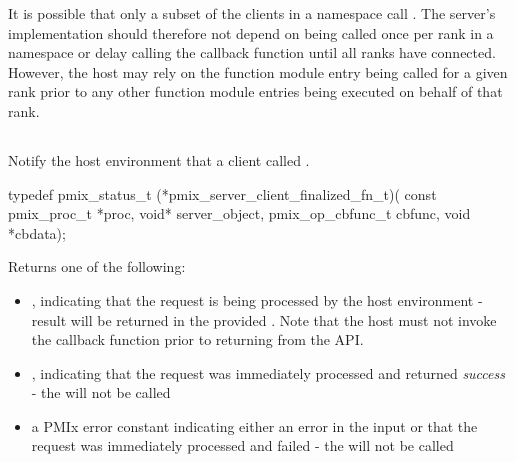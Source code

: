 It is possible that only a subset of the clients in a namespace call
.   The server's 
implementation should therefore not depend on being called once per rank in a
namespace or delay calling the callback function until all ranks have
connected. However, the host may rely on the
function module entry being called for a given rank prior to any other function
module entries being executed on behalf of that rank.

\subsection{}

\summary

Notify the host environment that a client called .

\format

\cspecificstart
\begin{codepar}
typedef pmix_status_t (*pmix_server_client_finalized_fn_t)(
                             const pmix_proc_t *proc,
                             void* server_object,
                             pmix_op_cbfunc_t cbfunc,
                             void *cbdata);
\end{codepar}
\cspecificend

\begin{arglist}
\end{arglist}

Returns one of the following:

\begin{itemize}
    \item {}, indicating that the request is being processed by the host environment - result will be returned in the provided . Note that the host must not invoke the callback function prior to returning from the \ac{API}.
    \item {}, indicating that the request was immediately processed and returned \textit{success} - the  will not be called
    \item a PMIx error constant indicating either an error in the input or that the request was immediately processed and failed - the  will not be called
\end{itemize}


